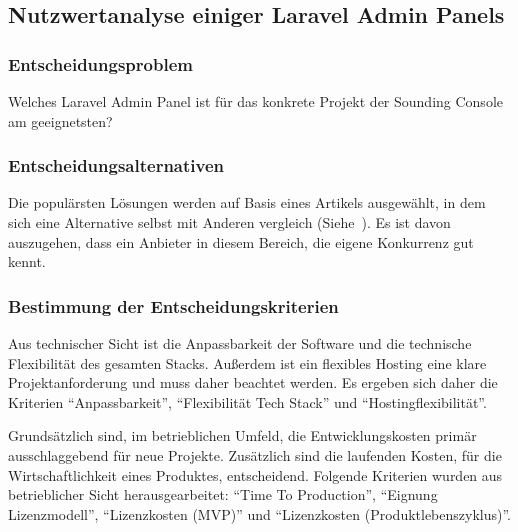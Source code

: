 \newpage

\subsection{Nutzwertanalyse einiger Laravel Admin Panels}

\subsubsection{Entscheidungsproblem}
Welches Laravel Admin Panel ist für das konkrete Projekt der Sounding Console am geeignetsten?

\subsubsection{Entscheidungsalternativen}
Die populärsten Lösungen werden auf Basis eines Artikels ausgewählt, in dem sich eine Alternative selbst mit Anderen vergleich (Siehe~\cite{the-guide-to-laravel-admin-panels}).
Es ist davon auszugehen, dass ein Anbieter in diesem Bereich, die eigene Konkurrenz gut kennt.

\subsubsection{Bestimmung der Entscheidungskriterien}
Aus technischer Sicht ist die Anpassbarkeit der Software und die technische Flexibilität des gesamten Stacks.
Außerdem ist ein flexibles Hosting eine klare Projektanforderung und muss daher beachtet werden.
Es ergeben sich daher die Kriterien \enquote{Anpassbarkeit}, \enquote {Flexibilität Tech Stack} und \enquote{Hostingflexibilität}.

Grundsätzlich sind, im betrieblichen Umfeld, die Entwicklungskosten primär ausschlaggebend für neue Projekte.
Zusätzlich sind die laufenden Kosten, für die Wirtschaftlichkeit eines Produktes, entscheidend.
Folgende Kriterien wurden aus betrieblicher Sicht herausgearbeitet: \enquote{Time To Production}, \enquote{Eignung Lizenzmodell}, \enquote{Lizenzkosten (MVP)} und \enquote{Lizenzkosten (Produktlebenszyklus)}.

